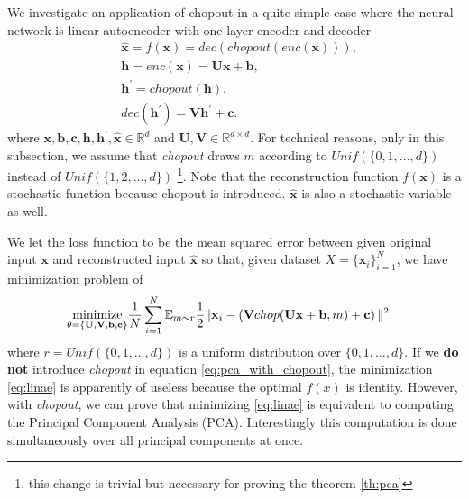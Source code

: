 \documentclass{article}
\newcommand{\minimize}{\mathop{\rm minimize}\limits}
\begin{document}
    We investigate an application of chopout in a quite simple case where the neural network is linear autoencoder with one-layer encoder and decoder
    \begin{align}
      &\hat{\mathbf{x}} = f(\mathbf{x}) =  dec(chopout(enc(\mathbf{x}))), \nonumber \\
      &\mathbf{h} = enc(\mathbf{x}) = \mathbf{U} \mathbf{x} + \mathbf{b}, \nonumber \\      
      &\mathbf{h}^\prime = chopout(\mathbf{h}), \label{eq:pca_with_chopout}\\
      &dec(\mathbf{h}^\prime) = \mathbf{V} \mathbf{h}^\prime + \mathbf{c}. \nonumber 
    \end{align}
    where $\mathbf{x}, \mathbf{b}, \mathbf{c}, \mathbf{h}, \mathbf{h}^\prime, \hat{\mathbf{x}} \in \mathbb{R}^d$ and  $\mathbf{U}, \mathbf{V} \in \mathbb{R}^{d \times d}$. 
    For technical reasons, only in this subsection, we assume that \textit{chopout} draws $m$ according to $Unif(\{0, 1, \dots, d\})$ instead of $Unif(\{1, 2, \dots, d\})$ 
    \footnote{this change is trivial but necessary for proving the theorem \ref{th:pca}}.
    Note that the reconstruction function $f(\mathbf{x})$ is a stochastic function because chopout is introduced. $\hat{\mathbf{x}}$ is also a stochastic variable as well.

    We let the loss function to be the mean squared error between given original input $\mathbf{x}$ and reconstructed input $\hat{\mathbf{x}}$ so that, given dataset $X = \{\mathbf{x}_i\}_{i=1}^N$, we have minimization problem of
    \begin{align}
      \minimize_{\mathbf{\theta} = \left\{ \mathbf{U}, \mathbf{V}, \mathbf{b}, \mathbf{c}\right\}} &\frac{1}{N} \sum_{i=1}^N \mathbb{E}_{m \sim r} \frac{1}{2} \Vert \mathbf{x}_i - \left( \mathbf{V} chop(\mathbf{U} \mathbf{x} + \mathbf{b}, m) + \mathbf{c} \right) \Vert^2 \label{eq:linae}
    \end{align}
    where $r = Unif(\{0,1,\dots,d\})$ is a uniform distribution over $\{0, 1, \dots, d\}$.
    If we \textbf{do not} introduce \textit{chopout} in equation \ref{eq:pca_with_chopout}, the minimization \ref{eq:linae} is apparently of useless because the optimal $f(x)$ is identity. However, with \textit{chopout}, we can prove that minimizing \ref{eq:linae} is equivalent to computing the Principal Component Analysis (PCA). Interestingly this computation is done simultaneously over all principal components at once.
\end{document}
